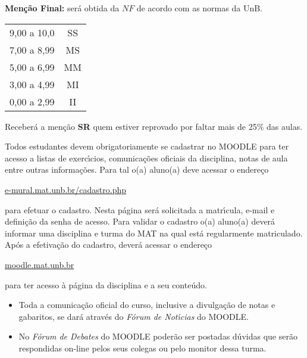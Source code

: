 \documentclass[12pt]{article}
\begin{document}
{\bf \noindent Men\c{c}\~{a}o Final:} ser\'{a} obtida da $NF$ de
acordo com as normas da UnB.
\begin{center}
    \begin{tabular}{c|c}
        \hline\hline
        \hspace{1cm}{Nota}\hspace{1cm} & \hspace{0.25cm}{Men\c{c}\~{a}o}\hspace{0.25cm}\\
        \hline\hline
        9,00 a 10,0 & SS \\
        \hline
        7,00 a 8,99 & MS \\
        \hline
        5,00 a 6,99 & MM \\
        \hline
        3,00 a 4,99 & MI \\
        \hline
        0,00 a 2,99  & II \\
        \hline\hline
    \end{tabular}
\end{center}
Receber{\'a} a men{\c c}{\~a}o {\bf SR} quem estiver reprovado por faltar mais de 25\%
das aulas.

 Todos estudantes devem
obrigatoriamente se cadastrar no MOODLE para ter acesso a listas de exerc{\'\i}cios, comunica\c{c}\~oes oficiais da disciplina, notas de aula entre outras informa\c{c}\~oes. Para tal o(a) aluno(a) deve acessar o endere\c{c}o
\begin{center}
    \url{e-mural.mat.unb.br/cadastro.php}
\end{center}
 para efetuar o cadastro. Nesta p\'agina ser\'a solicitada a matr{\'\i}cula, e-mail e defini\c{c}\~ao da senha de acesso. Para validar o cadastro o(a) aluno(a) dever\'a informar uma disciplina e turma do MAT na qual est\'a regularmente matriculado. Ap\'os a efetiva\c{c}\~ao do cadastro, dever\'a acessar o endere\c{c}o 
 \begin{center}
     \url{moodle.mat.unb.br}
 \end{center}
  para ter acesso \`a p\'agina da disciplina e a seu conte\'udo.


\begin{itemize}
\item Toda a comunica\c{c}\~{a}o oficial do curso, inclusive a divulga\c{c}\~{a}o de
notas e gabaritos, se dar\'{a} atrav\'{e}s do {\em F\'{o}rum de Not\'{\i}cias} do
MOODLE.\vspace{-0.20cm}
\item No {\em F\'{o}rum de Debates} do MOODLE poder\~{a}o ser
postadas d\'{u}vidas que ser\~{a}o respondidas on-line pelos seus
colegas ou pelo monitor dessa turma.
\end{itemize}
\end{document}
